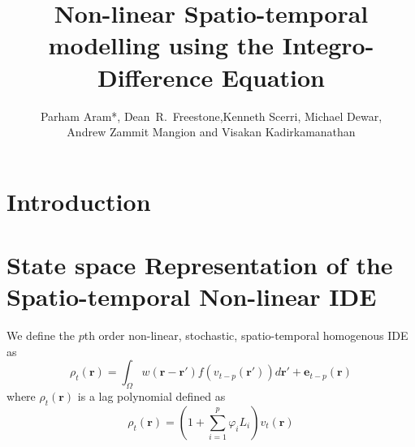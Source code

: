 \documentclass[a4paper,10pt]{article}
\title{Non-linear Spatio-temporal modelling using the Integro-Difference Equation}
\author{Parham Aram*,
        Dean~R.~Freestone,Kenneth Scerri, Michael Dewar,\\ Andrew Zammit Mangion and Visakan Kadirkamanathan}
\begin{document}
\maketitle

\begin{abstract}

\end{abstract}

\section{Introduction}
\section{State space Representation of the Spatio-temporal Non-linear IDE}
We define the $p$th order non-linear, stochastic, spatio-temporal homogenous IDE as
 \begin{equation}\label{eq:IDEModel}
  \rho_t(\mathbf r)=\int_{\Omega}w(\mathbf r-\mathbf r')f(v_{t-p}(\mathbf r'))d\mathbf r'+\mathbf e_{t-p}(\mathbf r) 
 \end{equation}
where $\rho_t(\mathbf r)$ is a lag polynomial defined as
\begin{equation}\label{eq:LagPolynomial}
 \rho_t(\mathbf r)=(1+\sum_{i=1}^{p}\varphi_i L_i)v_{t}\left(\mathbf r\right)
\end{equation}
\end{document}
